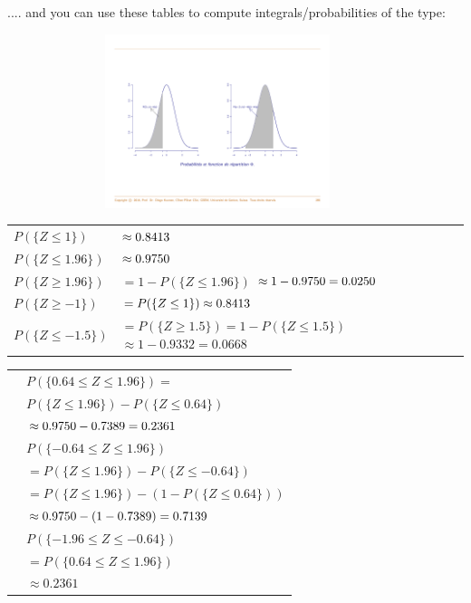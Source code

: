 \documentclass[notes=show,smaller,handout]{beamer}\usepackage[]{graphicx}\usepackage[]{color}
\begin{document}
\begin{frame}{\subsecname}
.... and you can use these tables to compute integrals/probabilities of the type:
\begin{figure}[ptb]\centering
\includegraphics[height=2in, width=4in]{img/CDF_pr.pdf}%
\end{figure}%
\end{frame}%

\begin{frame}{\subsecname}

\begin{example}[Prob of $Z$]


\noindent
\begin{tabular}{ll}
$P(\{Z\leq 1\})$ & $\approx0.8413\bigskip $ \\
$P(\{Z\leq 1.96\})$ & $\approx0.9750\bigskip $ \\
$P(\{Z\geq 1.96\})$ & $=1-P(\{Z\leq 1.96\})$ $\approx1-0.9750=0.0250\bigskip $\\
$P(\{Z\geq -1\})$ & $=P(\{Z\leq 1\})\approx0.8413\bigskip $ \\
$P(\{Z\leq -1.5\})$ & $=P(\{Z\geq 1.5\}) =1-P(\{Z\leq 1.5\})$ $\approx1-0.9332=0.0668$%
\end{tabular}

\end{example}
\end{frame}%

\begin{frame}{\subsecname}

\begin{example}[continued]

\begin{tabular}{ll}
& $P(\{0.64\leq Z\leq 1.96\})=$ \\
& $P(\{Z\leq 1.96\})-P(\{Z\leq 0.64\})$ \\
& $\approx 0.9750-0.7389=0.2361\bigskip $ \\
& $P(\{-0.64\leq Z\leq 1.96\})$ \\
& $=P(\{Z\leq 1.96\})-P(\{Z\leq -0.64\})$ \\
& $=P(\{Z\leq 1.96\})-(1-P(\{Z\leq 0.64\}))$ \\
& $\approx0.9750-(1-0.7389)=0.7139\bigskip $ \\
& $P(\{-1.96\leq Z\leq -0.64\})$ \\
& $=P(\{0.64\leq Z\leq 1.96\})$ \\
& $\approx0.2361$%
\end{tabular}
\end{example}
\end{frame}%
\end{document}
